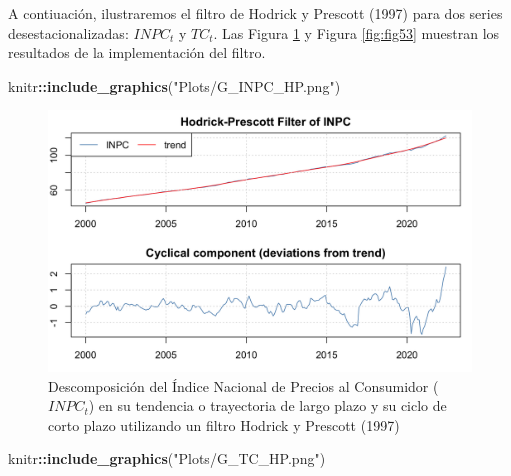 \documentclass[
]{book}
\newenvironment{Shaded}{\begin{snugshade}}{\end{snugshade}}
\newcommand{\FunctionTok}[1]{\textcolor[rgb]{0.13,0.29,0.53}{\textbf{#1}}}
\newcommand{\NormalTok}[1]{#1}
\newcommand{\SpecialCharTok}[1]{\textcolor[rgb]{0.81,0.36,0.00}{\textbf{#1}}}
\newcommand{\StringTok}[1]{\textcolor[rgb]{0.31,0.60,0.02}{#1}}
\begin{document}
A contiuación, ilustraremos el filtro de Hodrick y Prescott (1997) para dos series desestacionalizadas: \(INPC_t\) y \(TC_t\). Las Figura \ref{fig:fig52} y Figura \ref{fig:fig53} muestran los resultados de la implementación del filtro.

\begin{Shaded}
\begin{Highlighting}[]
\NormalTok{knitr}\SpecialCharTok{::}\FunctionTok{include\_graphics}\NormalTok{(}\StringTok{"Plots/G\_INPC\_HP.png"}\NormalTok{) }
\end{Highlighting}
\end{Shaded}

\begin{figure}

{\centering \includegraphics[width=0.95\linewidth]{Plots/G_INPC_HP} 

}

\caption{Descomposición del Índice Nacional de Precios al Consumidor ($INPC_t$) en su tendencia o trayectoria de largo plazo y su ciclo de corto plazo utilizando un filtro Hodrick y Prescott (1997)}\label{fig:fig52}
\end{figure}

\begin{Shaded}
\begin{Highlighting}[]
\NormalTok{knitr}\SpecialCharTok{::}\FunctionTok{include\_graphics}\NormalTok{(}\StringTok{"Plots/G\_TC\_HP.png"}\NormalTok{) }
\end{Highlighting}
\end{Shaded}
\end{document}

